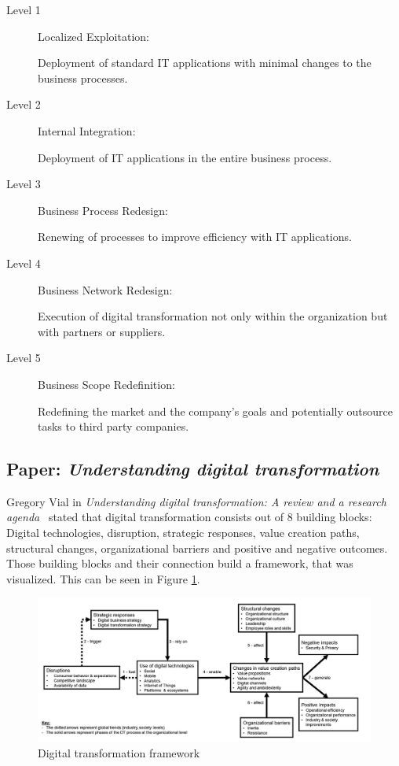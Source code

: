 \documentclass[a4]{scrartcl}
\begin{document}
\begin{description}
	\item[Level 1] Localized Exploitation: 
	
	Deployment of standard IT applications with minimal changes to the business processes.
	
	\item[Level 2] Internal Integration: 
	
	Deployment of IT applications in the entire business process.
	
	\item[Level 3] Business Process Redesign: 
	
	Renewing of processes to improve efficiency with IT applications.
	
	\item[Level 4] Business Network Redesign: 
	
	Execution of digital transformation not only within the organization but with partners or suppliers.
	
	\item[Level 5] Business Scope Redefinition: 
	
	Redefining the market and the company's goals and potentially outsource tasks to third party companies.
	
\end{description}


	
	
	
	
	
	
	
\subsection{Paper: \textit{Understanding digital transformation}} \label{vial}	
	
Gregory Vial in \textit{Understanding digital transformation: A review and a research agenda}~\cite{vial} stated that digital transformation consists out of 8 building blocks: Digital technologies, disruption, strategic responses, value creation paths, structural changes, organizational barriers and positive and negative outcomes.
Those building blocks and their connection build a framework, that was visualized. This can be seen in Figure \ref{vial_framework}.~\cite{vial}

\begin{figure}[h!]
	\centering
	\includegraphics[width=1\textwidth]{images/vial.png}
	\caption{Digital transformation framework \cite{vial}}
	\label{vial_framework}
\end{figure}
\end{document}
